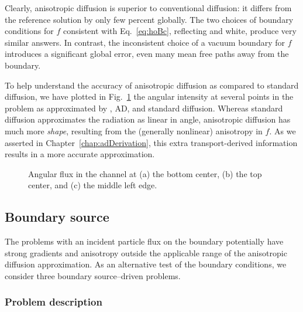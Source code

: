 Clearly, anisotropic diffusion is superior to conventional diffusion: it differs
from the reference solution by only few percent globally. The two choices of
boundary conditions for $f$ consistent with Eq.~\eqref{eq:hoBc}, reflecting and
white, produce very similar answers. In contrast, the inconsistent choice of a
vacuum boundary for $f$ introduces a significant global error, even many mean
free paths away from the boundary.

To help understand the accuracy of anisotropic diffusion as compared to standard
diffusion, we have plotted in Fig.~\ref{fig:bcReactorAngular} the angular
intensity at several points in the problem as approximated by \SN, AD, and
standard diffusion. Whereas standard diffusion approximates the radiation as linear in
angle, anisotropic diffusion has much more \emph{shape}, resulting from the
(generally nonlinear)
anisotropy in $f$. As we asserted in Chapter~\ref{chap:adDerivation}, this extra
transport-derived information results in a more accurate approximation.

\begin{figure}[htb]
  \centering\small

  \caption{Angular flux in the channel at (a) the bottom center, (b) the top
  center, and (c) the middle left edge.}
  \label{fig:bcReactorAngular}
\end{figure}

\subsection{Boundary source}

The problems with an incident particle flux on the boundary potentially have
strong gradients and anisotropy outside the applicable range of the anisotropic
diffusion approximation. As an alternative test of the boundary conditions, we
consider three boundary source--driven problems.

\subsubsection{Problem description}

